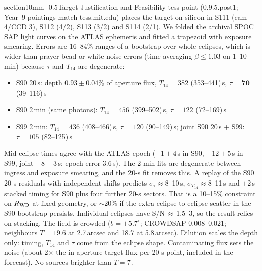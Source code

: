 \documentclass[letterpaper,11pt]{article}
\makeatletter
\renewcommand{\section}{\@startsection%
{section}{1}{0mm}{-\baselineskip}%
{0.5\baselineskip}{\normalfont\Large\bfseries}}%
\makeatother
\begin{document}
\section{Target Justification and Feasibility}
tess-point (0.9.5.post1; Year~9 pointings match tess.mit.edu) places the target on silicon in S111 (cam 4/CCD 3), S112 (4/2), S113 (3/2) and S114 (2/1). We folded the archival SPOC SAP light curves on the ATLAS ephemeris and fitted a trapezoid with exposure smearing. Errors are 16--84\% ranges of a bootstrap over whole eclipses, which is wider than prayer-bead or white-noise errors (time-averaging $\beta\le1.03$ on 1--10\,min) because $\tau$ and $T_{14}$ are degenerate:
\begin{itemize}\itemsep0pt
\item S90 20\,s: depth $0.93\pm0.04$\% of aperture flux, $T_{14}=382$ (353--441)\,s, $\tau=\mathbf{70}$ (39--116)\,s
\item S90 2\,min (same photons): $T_{14}=456$ (399--502)\,s, $\tau=122$ (72--169)\,s
\item S99 2\,min: $T_{14}=436$ (408--466)\,s, $\tau=120$ (90--149)\,s; joint S90 20\,s + S99: $\tau=105$ (82--125)\,s
\end{itemize}
Mid-eclipse times agree with the ATLAS epoch ($-1\pm4$\,s in S90, $-12\pm5$\,s in S99, joint $-8\pm3$\,s; epoch error 3.6\,s). The 2-min fits are degenerate between ingress and exposure smearing, and the 20-s fit removes this. A replay of the S90 20-s residuals with independent shifts predicts $\sigma_\tau\approx8$--10\,s, $\sigma_{T_{14}}\approx8$--11\,s and $\pm2$\,s stacked timing for S90 plus four further 20-s sectors. That is a 10--15\% constraint on $R_{\rm WD}$ at fixed geometry, or $\sim$20\% if the extra eclipse-to-eclipse scatter in the S90 bootstrap persists. Individual eclipses have S/N\,$\approx$\,1.5--3, so the result relies on stacking. The field is crowded ($b=+5.7^\circ$; CROWDSAP 0.008--0.021; neighbours $T=19.6$ at 2.7\,arcsec and 18.7 at 5.8\,arcsec). Dilution scales the depth only: timing, $T_{14}$ and $\tau$ come from the eclipse shape. Contaminating flux sets the noise (about 2$\times$ the in-aperture target flux per 20-s point, included in the forecast). No sources brighter than $T=7$.
\end{document}
